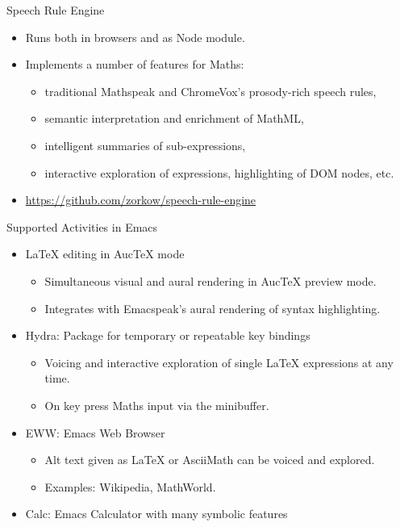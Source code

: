 \documentclass[final,hyperref={pdfpagelabels=false}]{beamer}
\begin{document}
\begin{frame}{}
\begin{columns}[t]
\begin{column}{.32\linewidth}
\begin{block}{\Large Speech Rule Engine}
\begin{itemize}
        \item Runs both in browsers and as Node module.
        \item Implements a number of features for Maths:
          \begin{itemize}
          \item traditional Mathspeak and ChromeVox's prosody-rich speech rules,
          \item semantic interpretation and enrichment of MathML,
          \item intelligent summaries of sub-expressions,
          \item interactive exploration of expressions, highlighting of DOM
            nodes, etc.
          \end{itemize}
        \item \textcolor{red}{\url{https://github.com/zorkow/speech-rule-engine}}
        \end{itemize}
      \end{block}
      \begin{block}{\Large Supported Activities in Emacs}
        \begin{itemize}
        \item {\LaTeX} editing in AucTeX mode
          \begin{itemize}
          \item Simultaneous visual and aural rendering in AucTeX preview mode.
          \item Integrates with Emacspeak's aural rendering of syntax highlighting.
          \end{itemize}
        \item Hydra: Package for temporary or repeatable key bindings
          \begin{itemize}
          \item Voicing and interactive exploration of single {\LaTeX}
            expressions at any time.
          \item On key press Maths input via the minibuffer.
          \end{itemize}
        \item EWW: Emacs Web Browser
          \begin{itemize}
          \item Alt text given as {\LaTeX} or AsciiMath can be voiced and explored.
          \item Examples: Wikipedia, MathWorld.
          \end{itemize}
        \item Calc: Emacs Calculator with many symbolic features

\end{itemize}
\end{block}
\end{column}
\end{columns}
\end{frame}
\end{document}
